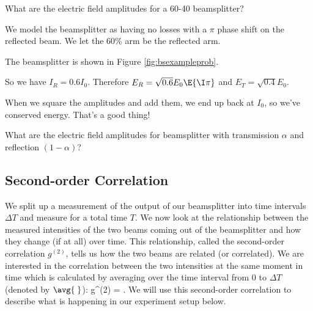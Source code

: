 \begin{example}
What are the electric field amplitudes for a 60-40 beamsplitter?

\model We model the beamsplitter as having no losses with a $\pi$ phase shift on the reflected beam. We let the 60\% arm be the reflected arm.

\vis The beamsplitter is shown in Figure \ref{fig:bsexampleprob}.

\begin{figure}
\centering
{}
\end{figure}

\sol So we have $I_R = 0.6 I_0$. Therefore $E_R = \sqrt{0.6}E_0 \E{\I\pi}$ and $E_T = \sqrt{0.4}E_0$.

\assess When we square the amplitudes and add them, we end up back at $I_0$, so we've conserved energy. That's a good thing!

\end{example}
\begin{exercise}
What are the electric field amplitudes for beamsplitter with transmission $\alpha$ and reflection $(1-\alpha)$?
\end{exercise}

\subsection{Second-order Correlation}
\label{sec:correlation}
We split up a measurement of the output of our beamsplitter into time intervals $\Delta T$ and measure for a total time $T$. We now look at the relationship between the measured intensities of the two beams coming out of the beamsplitter and how they change (if at all) over time. This relationship, called the second-order correlation $g^{(2)}$, tells us how the two beams are related (or correlated). We are interested in the correlation between the two intensities at the same moment in time which is calculated by averaging over the time interval from $0$ to $\Delta T$ (denoted by $\avg{\;}$):
\beq
g^{(2)} = .
\label{eq:gtwo}
\eeq
We will use this second-order correlation to describe what is happening in our experiment setup below.

